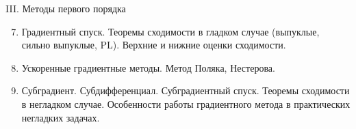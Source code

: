 \documentclass[9pt, aspectratio=169]{beamer}
\begin{document}
\begin{frame}{III. Методы первого порядка}
    \begin{minipage}{0.618\textwidth}
        \begin{enumerate}
            \setcounter{enumi}{6}
            \item Градиентный спуск. Теоремы сходимости в гладком случае (выпуклые, сильно выпуклые, PL). Верхние и нижние оценки сходимости.
            \item Ускоренные градиентные методы. Метод Поляка, Нестерова.
            \item Субградиент. Субдифференциал. Субградиентный спуск. Теоремы сходимости в негладком случае. Особенности работы градиентного метода в практических негладких задачах.
        \end{enumerate}
      \end{minipage}%
      \begin{minipage}{0.382\textwidth}
      \end{minipage}
\end{frame}
\end{document}
